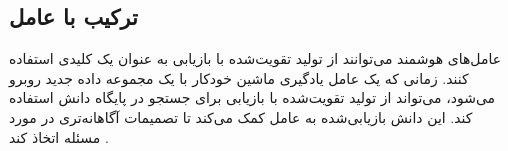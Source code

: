 \subsection{ترکیب با عامل}
عامل‌های هوشمند می‌توانند از تولید تقویت‌شده با بازیابی به عنوان یک  کلیدی استفاده کنند. زمانی که یک عامل یادگیری ماشین خودکار با یک مجموعه داده جدید روبرو می‌شود، می‌تواند از تولید تقویت‌شده با بازیابی برای جستجو در پایگاه دانش استفاده کند. این دانش بازیابی‌شده به عامل کمک می‌کند تا تصمیمات آگاهانه‌تری در مورد مسئله اتخاذ کند \cite{singh2025agenticrag}.


